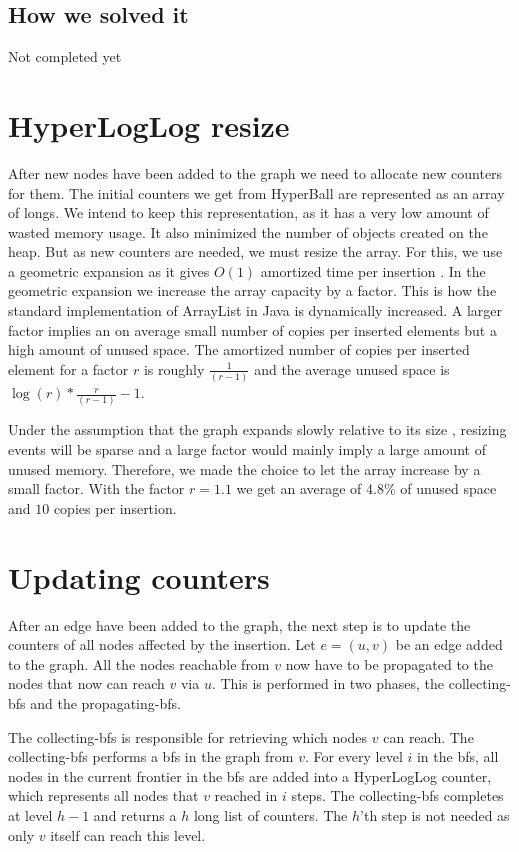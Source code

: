 \subsection{How we solved it}
Not completed yet

\section{HyperLogLog resize}
After new nodes have been added to the graph we need to allocate new counters for them. The initial counters we get from HyperBall are represented as an array of longs. We intend to keep this representation, as it has a very low amount of wasted memory usage. It also minimized the number of objects created on the heap. But as new counters are needed, we must resize the array. For this, we use a geometric expansion as it gives $O(1)$ amortized time per insertion \cite{dynamicarrays}. In the geometric expansion we increase the array capacity by a factor. This is how the standard implementation of ArrayList in Java is dynamically increased. A larger factor implies an on average small number of copies per inserted elements but a high amount of unused space. The amortized number of copies per inserted element for a factor $r$ is roughly $\frac{1}{(r-1)}$ and the average unused space is $\log(r)*\frac{r}{(r-1)} - 1$. \cite{dynamicarrays}

Under the assumption that the graph expands slowly relative to its size , resizing events will be sparse and a large factor would mainly imply a large amount of unused memory. Therefore, we made the choice to let the array increase by a small factor. With the factor $r = 1.1$ we get an average of $4.8$\% of unused space and $10$ copies per insertion. 

\section{Updating counters}

After an edge have been added to the graph, the next step is to update the counters of all nodes affected by the insertion.  Let $e = (u,v)$ be an edge added to the graph. All the nodes reachable from $v$ now have to be propagated to the nodes that now can reach $v$ via $u$. This is performed in two phases, the collecting-bfs and the propagating-bfs. 

The collecting-bfs is responsible for retrieving which nodes $v$ can reach. The collecting-bfs performs a bfs in the graph from $v$. For every level $i$ in the bfs, all nodes in the current frontier in the bfs are added into a HyperLogLog counter, which represents all nodes that $v$ reached in $i$ steps. The collecting-bfs completes at level $h-1$ and returns a $h$ long list of counters. The $h$'th step is not needed as only $v$ itself can reach this level. 

